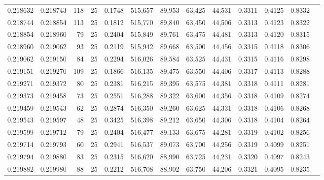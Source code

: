 \begin{tabular}{rrrrrrrrrrrrr}
0.218632 & 0.218743 &   118 &  25 &                                     0.1748 & 515,657 &  89,953 &  63,425 &  44,531 & 0.3311 & 0.4125 & 0.8332 \\
0.218744 & 0.218854 &   113 &  25 &                                     0.1812 & 515,770 &  89,840 &  63,450 &  44,506 & 0.3313 & 0.4123 & 0.8322 \\
0.218854 & 0.218960 &    79 &  25 &                                     0.2404 & 515,849 &  89,761 &  63,475 &  44,481 & 0.3313 & 0.4120 & 0.8315 \\
0.218960 & 0.219062 &    93 &  25 &                                     0.2119 & 515,942 &  89,668 &  63,500 &  44,456 & 0.3315 & 0.4118 & 0.8306 \\
0.219062 & 0.219150 &    84 &  25 &                                     0.2294 & 516,026 &  89,584 &  63,525 &  44,431 & 0.3315 & 0.4116 & 0.8298 \\
0.219151 & 0.219270 &   109 &  25 &                                     0.1866 & 516,135 &  89,475 &  63,550 &  44,406 & 0.3317 & 0.4113 & 0.8288 \\
0.219271 & 0.219372 &    80 &  25 &                                     0.2381 & 516,215 &  89,395 &  63,575 &  44,381 & 0.3318 & 0.4111 & 0.8281 \\
0.219373 & 0.219458 &    73 &  25 &                                     0.2551 & 516,288 &  89,322 &  63,600 &  44,356 & 0.3318 & 0.4109 & 0.8274 \\
0.219459 & 0.219543 &    62 &  25 &                                     0.2874 & 516,350 &  89,260 &  63,625 &  44,331 & 0.3318 & 0.4106 & 0.8268 \\
0.219543 & 0.219597 &    48 &  25 &                                     0.3425 & 516,398 &  89,212 &  63,650 &  44,306 & 0.3318 & 0.4104 & 0.8264 \\
0.219599 & 0.219712 &    79 &  25 &                                     0.2404 & 516,477 &  89,133 &  63,675 &  44,281 & 0.3319 & 0.4102 & 0.8256 \\
0.219714 & 0.219793 &    60 &  25 &                                     0.2941 & 516,537 &  89,073 &  63,700 &  44,256 & 0.3319 & 0.4099 & 0.8251 \\
0.219794 & 0.219880 &    83 &  25 &                                     0.2315 & 516,620 &  88,990 &  63,725 &  44,231 & 0.3320 & 0.4097 & 0.8243 \\
0.219882 & 0.219980 &    88 &  25 &                                     0.2212 & 516,708 &  88,902 &  63,750 &  44,206 & 0.3321 & 0.4095 & 0.8235 \\

\end{tabular}
